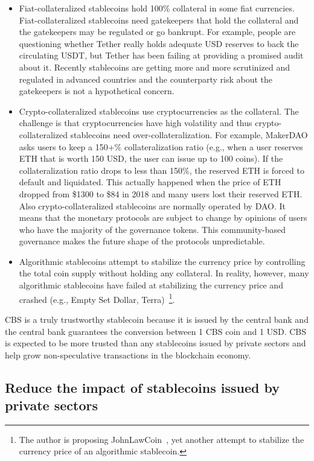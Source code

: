 \documentclass[dvipdfmx,a4paper]{article}
\begin{document}
\begin{itemize}
\item Fiat-collateralized stablecoins hold 100\% collateral in some fiat currencies. Fiat-collateralized stablecoins need gatekeepers that hold the collateral and the gatekeepers may be regulated or go bankrupt. For example, people are questioning whether Tether really holds adequate USD reserves to back the circulating USDT, but Tether has been failing at providing a promised audit about it. Recently stablecoins are getting more and more scrutinized and regulated in advanced countries and the counterparty risk about the gatekeepers is not a hypothetical concern.
\item Crypto-collateralized stablecoins use cryptocurrencies as the collateral. The challenge is that cryptocurrencies have high volatility and thus crypto-collateralized stablecoins need over-collateralization. For example, MakerDAO asks users to keep a 150+\% collateralization ratio (e.g., when a user reserves ETH that is worth 150 USD, the user can issue up to 100 coins). If the collateralization ratio drops to less than 150\%, the reserved ETH is forced to default and liquidated. This actually happened when the price of ETH dropped from \$1300 to \$84 in 2018 and many users lost their reserved ETH. Also crypto-collateralized stablecoins are normally operated by DAO. It means that the monetary protocols are subject to change by opinions of users who have the majority of the governance tokens. This community-based governance makes the future shape of the protocols unpredictable.
\item Algorithmic stablecoins attempt to stabilize the currency price by controlling the total coin supply without holding any collateral. In reality, however, many algorithmic stablecoins have failed at stabilizing the currency price and crashed (e.g., Empty Set Dollar, Terra)~\footnote{The author is proposing JohnLawCoin~\cite{johnlawcoin}, yet another attempt to stabilize the currency price of an algorithmic stablecoin.}.
\end{itemize}

CBS is a truly trustworthy stablecoin because it is issued by the central bank and the central bank guarantees the conversion between 1 CBS coin and 1 USD. CBS is expected to be more trusted than any stablecoins issued by private sectors and help grow non-speculative transactions in the blockchain economy.

\subsection{Reduce the impact of stablecoins issued by private sectors}
\end{document}
